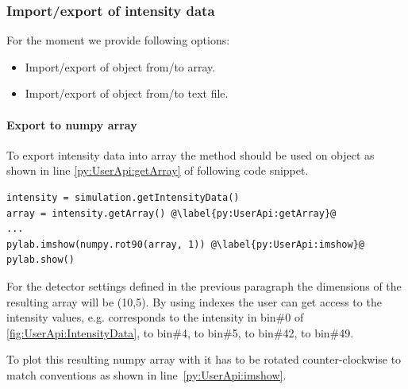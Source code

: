 

\subsubsection{Import/export of intensity data}
For the moment we provide following options:
\begin{itemize}
\item Import/export of  object from/to  array.
\item Import/export of  object from/to text file.

\end{itemize}

\paragraph{Export to numpy array}

To export intensity data into   array the method  should be used
on  object as shown in line \ref{py:UserApi:getArray} of
following code snippet.

\begin{lstlisting}
intensity = simulation.getIntensityData()
array = intensity.getArray() @\label{py:UserApi:getArray}@
...
pylab.imshow(numpy.rot90(array, 1)) @\label{py:UserApi:imshow}@
pylab.show()
\end{lstlisting}

For the detector settings defined in the previous paragraph the dimensions of the resulting array will be (10,5). By using  indexes the user can get access to the intensity values, e.g.
 corresponds to the intensity in bin\#0 of \cref{fig:UserApi:IntensityData},
 to bin\#4,
 to bin\#5,
 to bin\#42,
 to bin\#49.


To plot this resulting numpy array with  it has to be rotated counter-clockwise
to match  conventions as shown in line~\ref{py:UserApi:imshow}.


